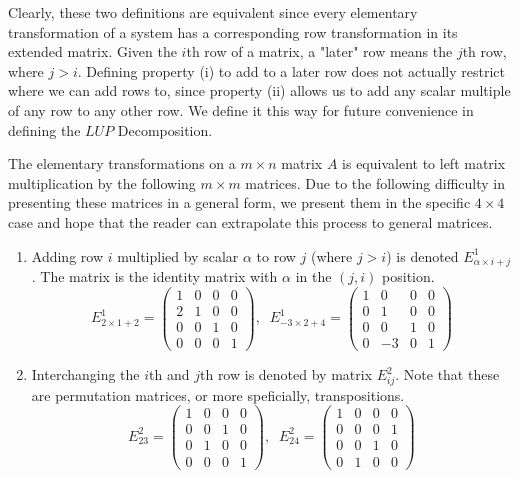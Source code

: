 \documentclass{article}
\begin{document}
    Clearly, these two definitions are equivalent since every elementary transformation of a system has a corresponding row transformation in its extended matrix. Given the $i$th row of a matrix, a "later" row means the $j$th row, where $j > i$. Defining property (i) to add to a later row does not actually restrict where we can add rows to, since property (ii) allows us to add any scalar multiple of any row to any other row. We define it this way for future convenience in defining the $L U P$ Decomposition. 

    \begin{definition}
      The elementary transformations on a $m \times n$ matrix $A$ is equivalent to left matrix multiplication by the following $m \times m$ matrices. Due to the following difficulty in presenting these matrices in a general form, we present them in the specific $4 \times 4$ case and hope that the reader can extrapolate this process to general matrices. 
      \begin{enumerate}
        \item Adding row $i$ multiplied by scalar $\alpha$ to row $j$ (where $j > i$) is denoted $E^1_{\alpha \times i + j}$. The matrix is the identity matrix with $\alpha$ in the $(j, i)$ position. 
        \begin{equation}
          E^1_{2 \times 1 + 2} = \begin{pmatrix}
          1&0&0&0 \\ 2&1&0&0 \\ 0&0&1&0 \\ 0&0&0&1
          \end{pmatrix}, \;\; E^1_{-3 \times 2 + 4} = \begin{pmatrix}
          1&0&0&0 \\ 0&1&0&0 \\ 0&0&1&0 \\ 0&-3&0&1
          \end{pmatrix}
        \end{equation}
        \item Interchanging the $i$th and $j$th row is denoted by matrix $E^2_{i j}$. Note that these are permutation matrices, or more speficially, transpositions. 
        \begin{equation}
          E^2_{2 3} = \begin{pmatrix}
          1&0&0&0 \\ 0&0&1&0 \\ 0&1&0&0 \\ 0&0&0&1
          \end{pmatrix}, \; \; E^2_{2 4} = \begin{pmatrix}
          1&0&0&0 \\ 0&0&0&1 \\ 0&0&1&0 \\ 0&1&0&0
          \end{pmatrix}
        \end{equation}


\end{enumerate}
\end{definition}
\end{document}
